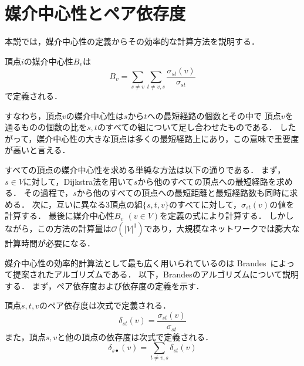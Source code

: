 \section{媒介中心性とペア依存度}
\label{sect:pairwise-dependency}

本説では，媒介中心性の定義からその効率的な計算方法を説明する．

\begin{definition}
  \label{def:betweenness-centrality}
  頂点$i$の媒介中心性$B_v$は
  \begin{equation}
    B_v=\sum_{s\neq v}\sum_{t\neq {v,s}}\frac{\sigma_{st}(v)}{\sigma_{st}}
    \label{eq:betweenness-centrality}
  \end{equation}
  で定義される．
\end{definition}

すなわち，頂点$v$の媒介中心性は$s$から$t$への最短経路の個数とその中で
頂点$v$を通るものの個数の比を$s,t$のすべての組について足し合わせたものである．
したがって，媒介中心性の大きな頂点は多くの最短経路上にあり，この意味で重要度が高いと言える．

すべての頂点の媒介中心性を求める単純な方法は以下の通りである．
まず，$s\in V$に対して，Dijkstra法を用いて$s$から他のすべての頂点への最短経路を求める．
その過程で，$s$から他のすべての頂点への最短距離と最短経路数も同時に求める．
次に，互いに異なる3頂点の組$\{s,t,v\}$のすべてに対して，$\sigma_{st}(v)$の値を計算する．
最後に媒介中心性$B_v$ $(v\in V)$を定義の式により計算する．
しかしながら，この方法の計算量は$\mathcal{O}(|V|^3)$であり，大規模なネットワークでは膨大な計算時間が必要になる．

媒介中心性の効率的計算法として最も広く用いられているのは
Brandes~\cite{Brandes2001}によって提案されたアルゴリズムである．
以下，Brandesのアルゴリズムについて説明する．
まず，ペア依存度および依存度の定義を示す．

\begin{definition}
  \label{def:pairwise-dependency}
  頂点$s,t,v$のペア依存度は次式で定義される．
  \begin{equation}
    \label{eq:def-pairwise-dependency}
    \delta_{st}(v)=\frac{\sigma_{st}(v)}{\sigma_{st}}
  \end{equation}
  また，頂点$s,v$と他の頂点の依存度は次式で定義される．
  \begin{equation}
    \label{eq:def-sum-pairwise-dependency}
    \delta_{s\bullet}(v)=\sum_{t\neq v,s}\delta_{st}(v)
  \end{equation}
\end{definition}

